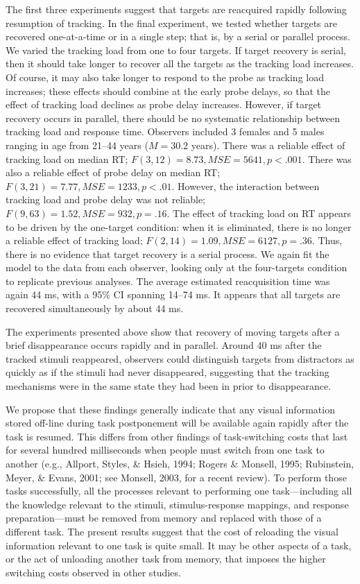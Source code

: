 \documentclass[man,nobf]{apa}
\newcommand{\MSE}{\ensuremath{\mathit{MSE}}}
\begin{document}
The first three experiments suggest that targets are reacquired rapidly
following resumption of tracking.  In the final experiment, we tested
whether targets are recovered one-at-a-time or in a single step; that is,
by a serial or parallel process.  We varied the tracking load from one to
four targets.  If target recovery is serial, then it should take longer to
recover all the targets as the tracking load increases.  Of course, it may
also take longer to respond to the probe as tracking load increases; these
effects should combine at the early probe delays, so that the effect of
tracking load declines as probe delay increases. However, if target
recovery occurs in parallel, there should be no systematic relationship
between tracking load and response time.  Observers included 3 females and
5 males ranging in age from 21--44 years ($M = 30.2$ years).  There was a
reliable effect of tracking load on median RT; $F(3, 12) = 8.73, \MSE =
5641, p < .001$.  There was also a reliable effect of probe delay on median
RT; $F(3, 21) = 7.77, \MSE = 1233, p < .01$.  However, the interaction
between tracking load and probe delay was not reliable; $F(9, 63) = 1.52,
\MSE = 932, p = .16$.  The effect of tracking load on RT appears to be
driven by the one-target condition: when it is eliminated, there is no
longer a reliable effect of tracking load; $F(2, 14) = 1.09, \MSE = 6127, p
= .36$.  Thus, there is no evidence that target recovery is a serial
process.  We again fit the model to the data from each observer, looking
only at the four-targets condition to replicate previous analyses.  The
average estimated reacquisition time was again 44 ms, with a 95\% CI
spanning 14--74 ms.  It appears that all targets are recovered
simultaneously by about 44 ms.

The experiments presented above show that recovery of moving targets after
a brief disappearance occurs rapidly and in parallel.  Around 40 ms after
the tracked stimuli reappeared, observers could distinguish targets from
distractors as quickly as if the stimuli had never disappeared, suggesting
that the tracking mechanisms were in the same state they had been in prior
to disappearance.

We propose that these findings generally indicate that any visual
information stored off-line during task postponement will be available
again rapidly after the task is resumed.  This differs from other findings
of task-switching costs that last for several hundred milliseconds when
people must switch from one task to another (e.g., Allport, Styles, \&
Hsieh, 1994; Rogers \& Monsell, 1995; Rubinstein, Meyer, \& Evans, 2001;
see Monsell, 2003, for a recent review).  To perform those tasks
successfully, all the processes relevant to performing one task---including
all the knowledge relevant to the stimuli, stimulus-response mappings, and
response preparation---must be removed from memory and replaced with those
of a different task.  The present results suggest that the cost of
reloading the visual information relevant to one task is quite small.  It
may be other aspects of a task, or the act of unloading another task from
memory, that imposes the higher switching costs observed in other studies.
\end{document}
